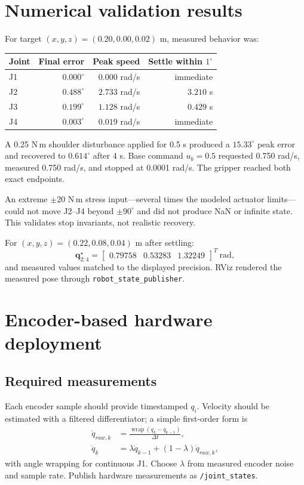 \documentclass[11pt,a4paper]{article}
\newcommand{\vect}[1]{\bm{#1}}
\newcommand{\code}[1]{\texttt{#1}}
\begin{document}
\section{Numerical validation results}
For target $(x,y,z)=(0.20,0.00,0.02)$ m, measured behavior was:
\begin{table}[h]
\centering
\begin{tabular}{lrrr}
\toprule Joint & Final error & Peak speed & Settle within $1^\circ$\\\midrule
J1 & $0.000^\circ$ & $0.000$ rad/s & immediate\\
J2 & $0.488^\circ$ & $2.733$ rad/s & $3.210$ s\\
J3 & $0.199^\circ$ & $1.128$ rad/s & $0.429$ s\\
J4 & $0.003^\circ$ & $0.019$ rad/s & immediate\\\bottomrule
\end{tabular}
\end{table}
A 0.25 N\,m shoulder disturbance applied for 0.5 s produced a
$15.33^\circ$ peak error and recovered to $0.614^\circ$ after 4 s. Base command
$u_b=0.5$ requested 0.750 rad/s, measured 0.750 rad/s, and stopped at
0.0001 rad/s. The gripper reached both exact endpoints.

An extreme $\pm20$ N\,m stress input---several times the modeled actuator
limits---could not move J2--J4 beyond $\pm90^\circ$ and did not produce NaN or
infinite state. This validates stop invariants, not realistic recovery.

For $(x,y,z)=(0.22,0.08,0.04)$ m after settling:
\[
\vect q^{\star}_{2:4}=
\begin{bmatrix}0.79758&0.53283&1.32249\end{bmatrix}^{T}\ \mathrm{rad},
\]
and measured values matched to the displayed precision. RViz rendered the
measured pose through \code{robot\_state\_publisher}.

\section{Encoder-based hardware deployment}

\subsection{Required measurements}
Each encoder sample should provide timestamped $q_i$. Velocity should be
estimated with a filtered differentiator; a simple first-order form is
\begin{align}
\dot q_{raw,k}&=\frac{\operatorname{wrap}(q_k-q_{k-1})}{\Delta t},\\
\dot q_k&=\lambda\dot q_{k-1}+(1-\lambda)\dot q_{raw,k},
\end{align}
with angle wrapping for continuous J1. Choose $\lambda$ from measured encoder
noise and sample rate. Publish hardware measurements as \code{/joint\_states}.
\end{document}

